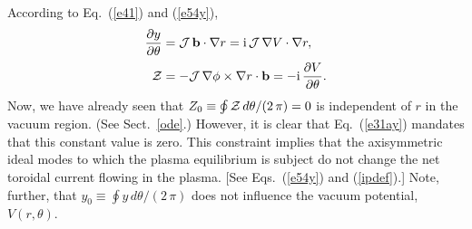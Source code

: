 \documentclass[12pt,prb,aps]{revtex4-1}
\begin{document}
According to Eq.~(\ref{e41}) and (\ref{e54y}),
\begin{align}\label{e30ay}
\frac{\partial y}{\partial \theta}&= {\cal J}\,{\bf b}\cdot\nabla r = {\rm i}\,{\cal J}\,\nabla V\cdot\nabla r,\\[0.5ex]
{\cal Z}&= -{\cal J}\,\nabla\phi\times\nabla r \cdot{\bf b} = - {\rm i}\,\frac{\partial V}{\partial\theta}.\label{e31ay}
\end{align}
Now, we have already seen that $Z_0\equiv \oint{\cal Z}\,d\theta/(2\,\pi)=0$ is independent of $r$ in the vacuum region.  (See Sect.~\ref{ode}.) 
However, it is clear that Eq.~(\ref{e31ay}) mandates that this constant value is zero. This constraint implies that the axisymmetric ideal modes to
which the plasma equilibrium is subject do not change the net toroidal current flowing in the plasma. [See Eqs.~(\ref{e54y}) and (\ref{ipdef}).]  Note, further, that $y_0\equiv \oint y\,d\theta/(2\,\pi)$ does
not influence the vacuum potential, $V(r,\theta)$. 
\end{document}
